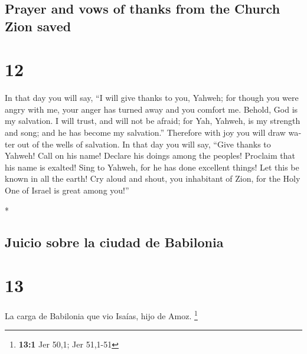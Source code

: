 \begin{paracol}{2}
\switchcolumn
\begin{otherlanguage}{english}

\hypertarget{prayer-and-vows-of-thanks-from-the-church-zion-saved}{%
\subsection{Prayer and vows of thanks from the Church Zion
saved}\label{prayer-and-vows-of-thanks-from-the-church-zion-saved}}

\hypertarget{section-23}{%
\section{12}\label{section-23}}

 In that day you will say, ``I will give thanks to you,
Yahweh; for though you were angry with me, your anger has turned away
and you comfort me.  Behold, God is my salvation. I will
trust, and will not be afraid; for Yah, Yahweh, is my strength and song;
and he has become my salvation.''  Therefore with joy you
will draw water out of the wells of salvation.  In that
day you will say, ``Give thanks to Yahweh! Call on his name! Declare his
doings among the peoples! Proclaim that his name is exalted!
 Sing to Yahweh, for he has done excellent things! Let
this be known in all the earth!  Cry aloud and shout, you
inhabitant of Zion, for the Holy One of Israel is great among you!''

\end{otherlanguage}

\switchcolumn[0]*

\hypertarget{juicio-sobre-la-ciudad-de-babilonia}{%
\subsection{Juicio sobre la ciudad de
Babilonia}\label{juicio-sobre-la-ciudad-de-babilonia}}

\hypertarget{section-24}{%
\section{13}\label{section-24}}

 La carga de Babilonia que vio Isaías, hijo de Amoz.
\footnote{\textbf{13:1} Jer 50,1; Jer 51,1-51}

\hypertarget{anuncio-del-duxeda-mundial-del-juicio-el-aterrador-acercamiento-del-ejuxe9rcito-convocado-por-dios}{%
}
\end{paracol}
